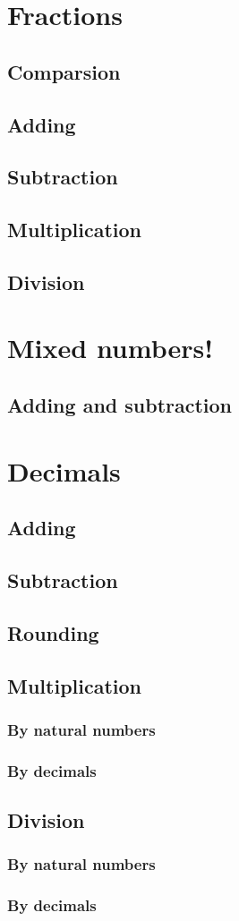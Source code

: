 \documentclass[a4paper, 12pt]{article}
\begin{document}
	

	{\Large \section {Fractions}}

	\subsection{Comparsion}
	\subsection{Adding}
	\subsection{Subtraction}
	\subsection{Multiplication}
	\subsection{Division}

	{\Large \section {Mixed numbers!}}

	\subsection{Adding and subtraction}

	{\Large \section {Decimals}}
	
	\subsection{Adding}
	\subsection{Subtraction}
	\subsection{Rounding}
	\subsection{Multiplication}
	\subsubsection{By natural numbers}
	\subsubsection{By decimals}
	\subsection{Division}
	\subsubsection{By natural numbers}
	\subsubsection{By decimals}

	
		
\end{document}
